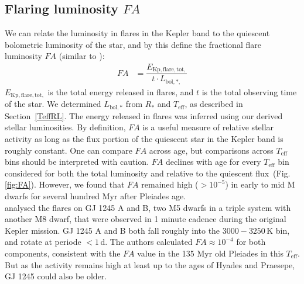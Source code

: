 \documentclass{aa}
\begin{document}
\subsection{Flaring luminosity $FA$}
\label{sec:fa}
We can relate the luminosity in flares in the Kepler band to the quiescent bolometric luminosity of the star, and by this define the fractional flare luminosity $FA$ (similar to ):
\begin{align}
\label{eq:FA}
FA&=\dfrac{E_\mathrm{Kp,flare,tot,}}{t\cdot L_{\mathrm{bol,*,}}}
\end{align}
$E_\mathrm{Kp,flare,tot,}$ is the total energy released in flares, and $t$ is the total observing time of the star.
We determined $L_\mathrm{bol,*}$ from $R_*$ and $T_\mathrm{eff}$, as described in Section~\ref{TeffRL}. The energy released in flares was inferred using our derived stellar luminosities. By definition, $FA$ is a useful measure of relative stellar activity as long as the flux portion of the quiescent star in the Kepler band is roughly constant. One can compare $FA$ across age, but comparisons across $T_\mathrm{eff}$ bins should be interpreted with caution. $FA$ declines with age for every $T_\mathrm{eff}$ bin considered for both the total luminosity and relative to the quiescent flux~(Fig. \ref{fig:FA}). However, we found that $FA$ remained high ($>10^{-5}$) in early to mid M dwarfs for several hundred Myr after Pleiades age. 
\\ 
\citet{lurie2015} analysed the flares on GJ 1245 A and B, two M5 dwarfs in a triple system with another M8 dwarf, that were observed in 1 minute cadence during the original Kepler mission. GJ 1245 A and B both fall roughly into the $3000-3250\,$K bin, and rotate at periode $<1$\,d. The authors calculated $FA\approx 10^{-4}$ for both components, consistent with the $FA$ value in the 135 Myr old Pleiades in this $T_\mathrm{eff}$. But as the activity remains high at least up to the ages of Hyades and Praesepe, GJ 1245 could also be older.
\end{document}
